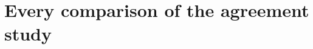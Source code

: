 \begin{table}[htbp]
  \centering
  \small
  \caption{ABC-SMC at four particle counts, the true parameters drawn from the prior, 500
  datasets per model and count (the same datasets at every count): coverage of the 95\%
  highest-density interval with its Clopper--Pearson interval, the interval's mean width,
  the posterior's effective sample size as a share of the particles, the last generation's
  acceptance rate and the model runs spent (\cref{sec:validation}). Generated by
  .}
  \label{tab:abc-sweep}
  \setlength{\tabcolsep}{3.5pt}
  \footnotesize
  
\end{table}



\clearpage
\section{Every comparison of the agreement study}
\label{app:agreement}

{\scriptsize
\setlength{\tabcolsep}{3pt}
\renewcommand{\arraystretch}{0.94}

}
